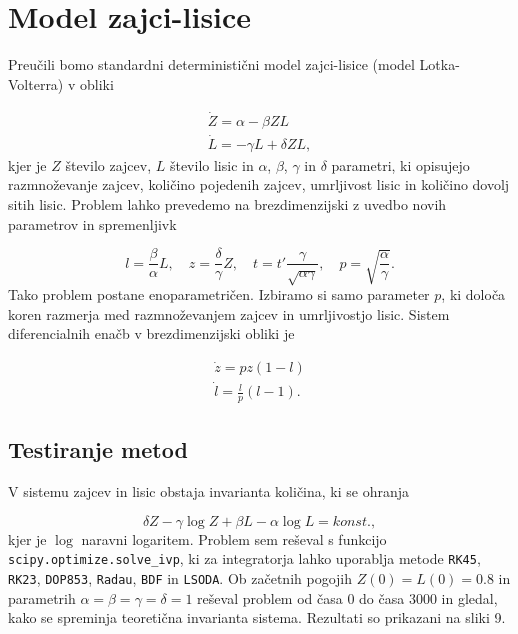 \documentclass[slovene,11pt,a4paper]{article}
\begin{document}
\newpage

\section{Model zajci-lisice}

Preučili bomo standardni deterministični model zajci-lisice (model Lotka-Volterra) v obliki

\begin{align}
\dot{Z} = \alpha - \beta ZL \\
\dot{L} = -\gamma L + \delta ZL,
\end{align}
kjer je $Z$ število zajcev, $L$ število lisic in $\alpha$, $\beta$, $\gamma$ in $\delta$ parametri, ki opisujejo razmnoževanje zajcev, količino pojedenih zajcev, umrljivost lisic in količino dovolj sitih lisic. Problem lahko prevedemo na brezdimenzijski z uvedbo novih parametrov in spremenljivk

\[
l = \frac{\beta}{\alpha} L, \quad z = \frac{\delta}{\gamma} Z, \quad
t = t' \frac{\gamma}{\sqrt{\alpha \gamma}}, \quad p = \sqrt{\frac{\alpha}{\gamma}}.
\]
Tako problem postane enoparametričen. Izbiramo si samo parameter $p$, ki določa koren razmerja med razmnoževanjem zajcev in umrljivostjo lisic. Sistem diferencialnih enačb v brezdimenzijski obliki je

\begin{align}
\dot{z} = pz (1-l) \\
\dot{l} = \frac{l}{p} (l-1).
\end{align}

\subsection{Testiranje metod}

V sistemu zajcev in lisic obstaja invarianta količina, ki se ohranja

\begin{equation}
\delta Z - \gamma \log Z + \beta L - \alpha \log L = konst.,
\end{equation}
kjer je $\log$ naravni logaritem. Problem sem reševal s funkcijo \texttt{scipy.optimize.solve\_ivp}, ki za integratorja lahko uporablja metode \texttt{RK45}, \texttt{RK23}, \texttt{DOP853}, \texttt{Radau}, \texttt{BDF} in \texttt{LSODA}. Ob začetnih pogojih $Z(0) = L(0) = 0.8$ in parametrih $\alpha=\beta=\gamma=\delta=1$ reševal problem od časa $0$ do časa $3000$ in gledal, kako se spreminja teoretična invarianta sistema. Rezultati so prikazani na sliki 9.
\end{document}
